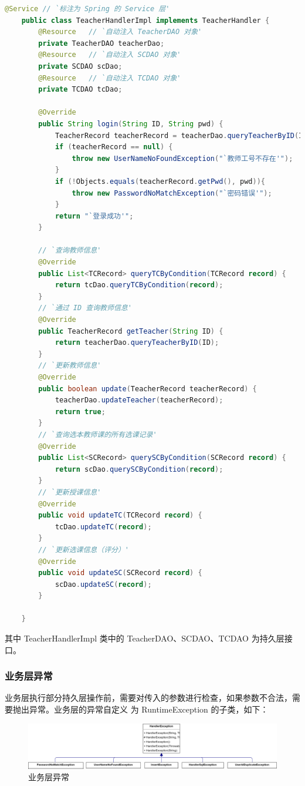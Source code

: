 \documentclass[12pt, a4paper]{article}
\begin{document}
\begin{lstlisting}[language = Java]
	@Service // `标注为 Spring 的 Service 层'
	public class TeacherHandlerImpl implements TeacherHandler {
		@Resource	// `自动注入 TeacherDAO 对象'
		private TeacherDAO teacherDao;
		@Resource	// `自动注入 SCDAO 对象'
		private SCDAO scDao;
		@Resource	// `自动注入 TCDAO 对象'
		private TCDAO tcDao;
	
		@Override
		public String login(String ID, String pwd) {
			TeacherRecord teacherRecord = teacherDao.queryTeacherByID(ID);
			if (teacherRecord == null) {
				throw new UserNameNoFoundException("`教师工号不存在'");
			}
			if (!Objects.equals(teacherRecord.getPwd(), pwd)){
				throw new PasswordNoMatchException("`密码错误'");
			}
			return "`登录成功'";
		}
	
		// `查询教师信息'
		@Override
		public List<TCRecord> queryTCByCondition(TCRecord record) {
			return tcDao.queryTCByCondition(record);
		}
		// `通过 ID 查询教师信息'
		@Override
		public TeacherRecord getTeacher(String ID) {
			return teacherDao.queryTeacherByID(ID);
		}
	 	// `更新教师信息'
		@Override
		public boolean update(TeacherRecord teacherRecord) {
			teacherDao.updateTeacher(teacherRecord);
			return true;
		}
		// `查询选本教师课的所有选课记录'
		@Override
		public List<SCRecord> querySCByCondition(SCRecord record) {
			return scDao.querySCByCondition(record);
		}
		// `更新授课信息'
		@Override
		public void updateTC(TCRecord record) {
			tcDao.updateTC(record);
		}
		// `更新选课信息（评分）'
		@Override
		public void updateSC(SCRecord record) {
			scDao.updateSC(record);
		}
	
	}
\end{lstlisting}
其中 TeacherHandlerImpl 类中的 TeacherDAO、SCDAO、TCDAO 为持久层接口。
\subsubsection{业务层异常}
业务层执行部分持久层操作前，需要对传入的参数进行检查，如果参数不合法，需要抛出异常。业务层的异常自定义
为 RuntimeException 的子类，如下：
\begin{figure}[H]
  \centering
  \includegraphics[width = 0.9 \textwidth]{HandlerException.png}
  \caption{业务层异常}
\end{figure}
\end{document}

